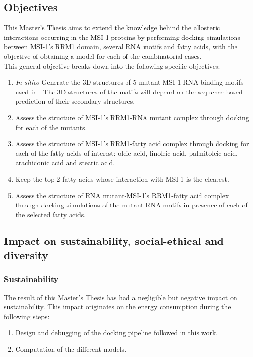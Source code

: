 \subsection{Objectives}

This Master's Thesis aims to extend the knowledge behind the allosteric interactions occurring in the MSI-1 proteins by performing docking simulations between MSI-1's RRM1 domain, several RNA motifs and fatty acids, with the objective of obtaining a model for each of the combinatorial cases.\\

This general objective breaks down into the following specific objectives:

\begin{enumerate}
    \item \textit{In silico} Generate the 3D structures of 5 mutant MSI-1 RNA-binding motifs used in \cite{dolcemascolo_2022}. The 3D structures of the motifs will depend on the sequence-based-prediction of their secondary structures.
    \item Assess the structure of MSI-1's RRM1-RNA mutant complex through docking for each of the mutants.
    \item Assess the structure of MSI-1's RRM1-fatty acid complex through docking for each of the fatty acids of interest: oleic acid, linoleic acid, palmitoleic acid, arachidonic acid and stearic acid.
    \item Keep the top 2 fatty acids whose interaction with MSI-1 is the clearest.
    \item Assess the structure of RNA mutant-MSI-1's RRM1-fatty acid complex through docking simulations of the mutant RNA-motifs in presence of each of the selected fatty acids.
\end{enumerate}
    
\subsection{Impact on sustainability, social-ethical and diversity}

\subsubsection{Sustainability}

The result of this Master's Thesis has had a negligible but negative impact on sustainability. This impact originates on the energy consumption during the following steps:

\begin{enumerate}
    \item Design and debugging of the docking pipeline followed in this work.
    \item Computation of the different models.
\end{enumerate}

